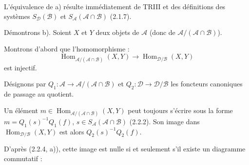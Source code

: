 L'équivalence de a) résulte immédiatement de TRIII et des définitions des
systèmes $S_{\mathcal D}(\mathcal B)$ et
$S_{\mathcal A}(\mathcal A\cap\mathcal B)$ (2.1.7).

Démontrons b). Soient $X$ et $Y$ deux objets de $\mathcal A$ (donc de
$\mathcal A/(\mathcal A\cap\mathcal B)$).

Montrons d'abord que l'homomorphisme :
\[
  \operatorname{Hom}_{\mathcal A/(\mathcal A\cap\mathcal B)}(X,Y)
  \longrightarrow
  \operatorname{Hom}_{\mathcal D/\mathcal B}(X,Y)
\]
est injectif.

Désignons par
$Q_1\colon\mathcal A\longrightarrow
\mathcal A/(\mathcal A\cap\mathcal B)$ et
$Q_2\colon\mathcal D\longrightarrow\mathcal D/\mathcal B$ les foncteurs
canoniques de passage au quotient.

Un élément
$m\in\operatorname{Hom}_{\mathcal A/(\mathcal A\cap\mathcal B)}(X,Y)$ peut
toujours s'écrire sous la forme $m=Q_1(s)^{-1}Q_1(f)$,
$s\in S_{\mathcal A}(\mathcal A\cap\mathcal B)$ (2.2.2). Son image dans
$\operatorname{Hom}_{\mathcal D/\mathcal B}(X,Y)$ est alors
$Q_2(s)^{-1}Q_2(f)$.

D'après (2.2.4, a)), cette image est nulle si et seulement s'il existe un
diagramme commutatif :

\begin{center}
\end{center}
\endgroup
